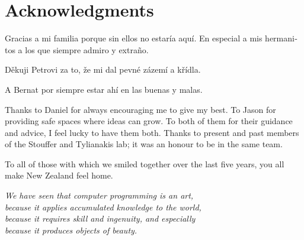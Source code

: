 {}
\chapter*{Acknowledgments}

\begin{otherlanguage}{spanish}
Gracias a mi familia porque sin ellos no estaría aquí.
En especial a mis hermanitos a los que siempre admiro y extraño.
\end{otherlanguage}
\begin{otherlanguage}{spanish}
Děkuji Petrovi za to, že mi dal pevné zázemí a křídla.
\end{otherlanguage}
\begin{otherlanguage}{spanish}
A Bernat por siempre estar ahí en las buenas y malas.
\end{otherlanguage}

Thanks to Daniel for always encouraging me to give my best.
To Jason for providing safe spaces where ideas can grow.
To both of them for their guidance and advice, I feel lucky to have them both.
Thanks to present and past members of the Stouffer and Tylianakis lab; it was an honour to be in the same team.

To all of those with which we smiled together over the last five years, you all make New Zealand feel home.

\begin{flushright}{\slshape
    We have seen that computer programming is an art, \\
    because it applies accumulated knowledge to the world, \\
    because it requires skill and ingenuity, and especially \\
    because it produces objects of beauty.} \\ \medskip
\end{flushright}
